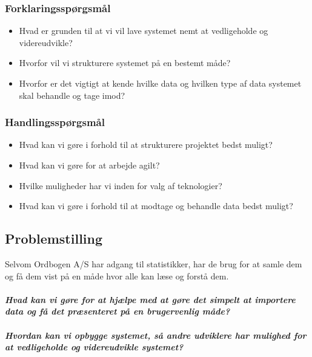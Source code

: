 \subsubsection{Forklaringsspørgsmål}
\begin{itemize}
    \item{Hvad er grunden til at vi vil lave systemet nemt at vedligeholde og videreudvikle?}
    \item{Hvorfor vil vi strukturere systemet på en bestemt måde?}
    \item{Hvorfor er det vigtigt at kende hvilke data og hvilken type af data systemet skal behandle og tage imod?}
\end{itemize}
\subsubsection{Handlingsspørgsmål}
\begin{itemize}
    \item{Hvad kan vi gøre i forhold til at strukturere projektet bedst muligt?}
    \item{Hvad kan vi gøre for at arbejde agilt?}
    \item{Hvilke muligheder har vi inden for valg af teknologier?}
    \item{Hvad kan vi gøre i forhold til at modtage og behandle data bedst muligt?}
\end{itemize}
\subsection{Problemstilling}
Selvom Ordbogen A/S har adgang til statistikker, har de brug for at samle dem og få dem vist på en måde hvor alle kan læse og forstå dem.
\\\\
\textbf{\textit{Hvad kan vi gøre for at hjælpe med at gøre det simpelt at importere data og få det præsenteret på en brugervenlig måde?}}
\\\\
\textbf{\textit{Hvordan kan vi opbygge systemet, så andre udviklere har mulighed for at vedligeholde og videreudvikle systemet?}}
